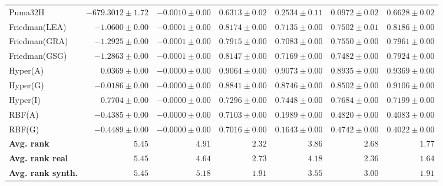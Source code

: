 \begin{table*}[!htbp]
{\begin{tabular}{lrrrrrr}
		Puma32H & $-679.3012 \pm 1.72$ & $-0.0010 \pm 0.00$ & $0.6313 \pm 0.02$ & $0.2534 \pm 0.11$ & $0.0972 \pm 0.02$ & $\mathbf{0.6628 \pm 0.02}$\\
		Friedman(LEA) & $-1.0600 \pm 0.00$ & $-0.0001 \pm 0.00$ & $0.8174 \pm 0.00$ & $0.7135 \pm 0.00$ & $0.7502 \pm 0.01$ & $\mathbf{0.8186 \pm 0.00}$\\
		Friedman(GRA) & $-1.2925 \pm 0.00$ & $-0.0001 \pm 0.00$ & $0.7915 \pm 0.00$ & $0.7083 \pm 0.00$ & $0.7550 \pm 0.00$ & $\mathbf{0.7961 \pm 0.00}$\\
		Friedman(GSG) & $-1.2863 \pm 0.00$ & $-0.0001 \pm 0.00$ & $\mathbf{0.8147 \pm 0.00}$ & $0.7169 \pm 0.00$ & $0.7482 \pm 0.00$ & $0.7924 \pm 0.00$\\
		Hyper(A) & $0.0369 \pm 0.00$ & $-0.0000 \pm 0.00$ & $0.9064 \pm 0.00$ & $0.9073 \pm 0.00$ & $0.8935 \pm 0.00$ & $\mathbf{0.9369 \pm 0.00}$\\
		Hyper(G) & $-0.0186 \pm 0.00$ & $-0.0000 \pm 0.00$ & $0.8841 \pm 0.00$ & $0.8746 \pm 0.00$ & $0.8502 \pm 0.00$ & $\mathbf{0.9106 \pm 0.00}$\\
		Hyper(I) & $\mathbf{0.7704 \pm 0.00}$ & $-0.0000 \pm 0.00$ & $0.7296 \pm 0.00$ & $0.7448 \pm 0.00$ & $0.7684 \pm 0.00$ & $0.7199 \pm 0.00$\\
		RBF(A) & $-0.4385 \pm 0.00$ & $-0.0000 \pm 0.00$ & $\mathbf{0.7103 \pm 0.00}$ & $0.1989 \pm 0.00$ & $0.4820 \pm 0.00$ & $0.4083 \pm 0.00$\\
		RBF(G) & $-0.4489 \pm 0.00$ & $-0.0000 \pm 0.00$ & $\mathbf{0.7016 \pm 0.00}$ & $0.1643 \pm 0.00$ & $0.4742 \pm 0.00$ & $0.4022 \pm 0.00$\\
		\midrule
		\textbf{{Avg. rank}} & $5.45$ & $4.91$ & $2.32$ & $3.86$ & $2.68$ & $\mathbf{1.77}$\\
		\textbf{{Avg. rank real}} & $5.45$ & $4.64$ & $2.73$ & $4.18$ & $2.36$ & $\mathbf{1.64}$\\
		\textbf{{Avg. rank synth.}} & $5.45$ & $5.18$ & $\mathbf{1.91}$ & $3.55$ & $3.00$ & $\mathbf{1.91}$\\
		\bottomrule
	\end{tabular}}
\end{table*}
